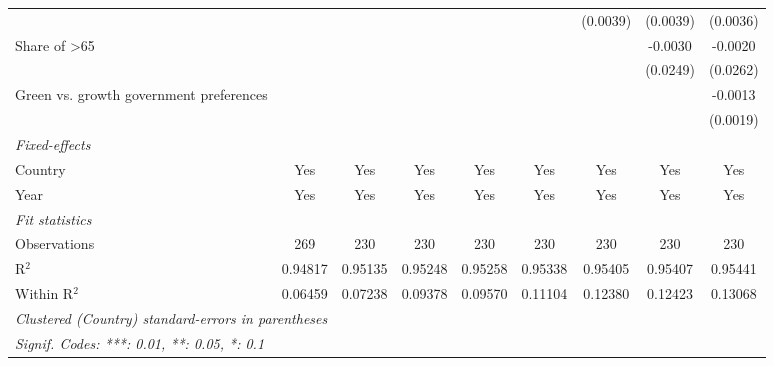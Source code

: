 \begin{table}[htbp]
\begin{tabular}{lcccccccc}
                                                       &               &              &          &          &          & (0.0039) & (0.0039) & (0.0036)\\   
      Share of >65                                     &               &              &          &          &          &          & -0.0030  & -0.0020\\   
                                                       &               &              &          &          &          &          & (0.0249) & (0.0262)\\   
      Green vs. growth government preferences          &               &              &          &          &          &          &          & -0.0013\\   
                                                       &               &              &          &          &          &          &          & (0.0019)\\   
      \midrule
      \emph{Fixed-effects}\\
      Country                                          & Yes           & Yes          & Yes      & Yes      & Yes      & Yes      & Yes      & Yes\\  
      Year                                             & Yes           & Yes          & Yes      & Yes      & Yes      & Yes      & Yes      & Yes\\  
      \midrule
      \emph{Fit statistics}\\
      Observations                                     & 269           & 230          & 230      & 230      & 230      & 230      & 230      & 230\\  
      R$^2$                                            & 0.94817       & 0.95135      & 0.95248  & 0.95258  & 0.95338  & 0.95405  & 0.95407  & 0.95441\\  
      Within R$^2$                                     & 0.06459       & 0.07238      & 0.09378  & 0.09570  & 0.11104  & 0.12380  & 0.12423  & 0.13068\\  
      \midrule \midrule
      \multicolumn{9}{l}{\emph{Clustered (Country) standard-errors in parentheses}}\\
      \multicolumn{9}{l}{\emph{Signif. Codes: ***: 0.01, **: 0.05, *: 0.1}}\\
   \end{tabular}
\end{table}


